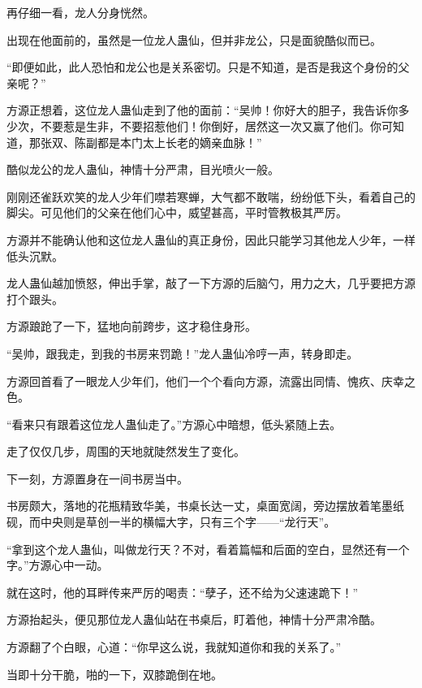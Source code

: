 
\begin{this_body}



再仔细一看，龙人分身恍然。

出现在他面前的，虽然是一位龙人蛊仙，但并非龙公，只是面貌酷似而已。

“即便如此，此人恐怕和龙公也是关系密切。只是不知道，是否是我这个身份的父亲呢？”

方源正想着，这位龙人蛊仙走到了他的面前：“吴帅！你好大的胆子，我告诉你多少次，不要惹是生非，不要招惹他们！你倒好，居然这一次又赢了他们。你可知道，那张双、陈副都是本门太上长老的嫡亲血脉！”

酷似龙公的龙人蛊仙，神情十分严肃，目光喷火一般。

刚刚还雀跃欢笑的龙人少年们噤若寒蝉，大气都不敢喘，纷纷低下头，看着自己的脚尖。可见他们的父亲在他们心中，威望甚高，平时管教极其严厉。

方源并不能确认他和这位龙人蛊仙的真正身份，因此只能学习其他龙人少年，一样低头沉默。

龙人蛊仙越加愤怒，伸出手掌，敲了一下方源的后脑勺，用力之大，几乎要把方源打个跟头。

方源踉跄了一下，猛地向前跨步，这才稳住身形。

“吴帅，跟我走，到我的书房来罚跪！”龙人蛊仙冷哼一声，转身即走。

方源回首看了一眼龙人少年们，他们一个个看向方源，流露出同情、愧疚、庆幸之色。

“看来只有跟着这位龙人蛊仙走了。”方源心中暗想，低头紧随上去。

走了仅仅几步，周围的天地就陡然发生了变化。

下一刻，方源置身在一间书房当中。

书房颇大，落地的花瓶精致华美，书桌长达一丈，桌面宽阔，旁边摆放着笔墨纸砚，而中央则是草创一半的横幅大字，只有三个字——“龙行天”。

“拿到这个龙人蛊仙，叫做龙行天？不对，看着篇幅和后面的空白，显然还有一个字。”方源心中一动。

就在这时，他的耳畔传来严厉的喝责：“孽子，还不给为父速速跪下！”

方源抬起头，便见那位龙人蛊仙站在书桌后，盯着他，神情十分严肃冷酷。

方源翻了个白眼，心道：“你早这么说，我就知道你和我的关系了。”

当即十分干脆，啪的一下，双膝跪倒在地。


\end{this_body}
